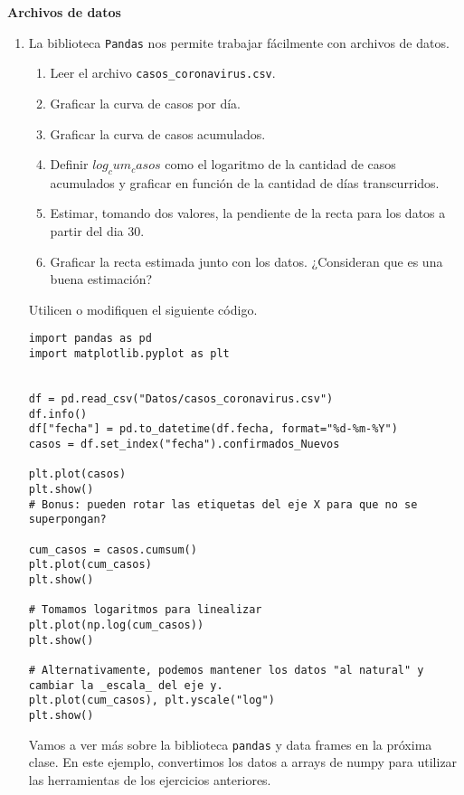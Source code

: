 \documentclass[a4paper,11pt]{article}
\theoremstyle{definition}
\begin{document}
\textbf{\large Archivos de datos}

\begin{enumerate}[resume]
\item La biblioteca \lstinline{Pandas} nos permite trabajar fácilmente con archivos de datos.

\begin{enumerate}
\item Leer el archivo \lstinline{casos_coronavirus.csv}.
\item Graficar la curva de casos por día.
\item Graficar la curva de casos acumulados.
\item Definir $log_cum_casos$ como el logaritmo de la cantidad de casos acumulados y graficar en función de la cantidad de días transcurridos.
\item Estimar, tomando dos valores, la pendiente de la recta para los datos a partir del dia 30.
\item Graficar la recta estimada junto con los datos. ¿Consideran que es una buena estimación?
\end{enumerate}

Utilicen o modifiquen el siguiente código.

\begin{lstlisting}
import pandas as pd
import matplotlib.pyplot as plt


df = pd.read_csv("Datos/casos_coronavirus.csv") 
df.info()
df["fecha"] = pd.to_datetime(df.fecha, format="%d-%m-%Y")
casos = df.set_index("fecha").confirmados_Nuevos

plt.plot(casos)
plt.show()
# Bonus: pueden rotar las etiquetas del eje X para que no se superpongan?

cum_casos = casos.cumsum()
plt.plot(cum_casos)
plt.show()

# Tomamos logaritmos para linealizar
plt.plot(np.log(cum_casos))
plt.show()

# Alternativamente, podemos mantener los datos "al natural" y cambiar la _escala_ del eje y.
plt.plot(cum_casos), plt.yscale("log")
plt.show()
\end{lstlisting}

Vamos a ver más sobre la biblioteca \lstinline{pandas} y data frames en la próxima clase. En este ejemplo, convertimos los datos a arrays de numpy para utilizar las herramientas de los ejercicios anteriores.

\end{enumerate}
\end{document}
